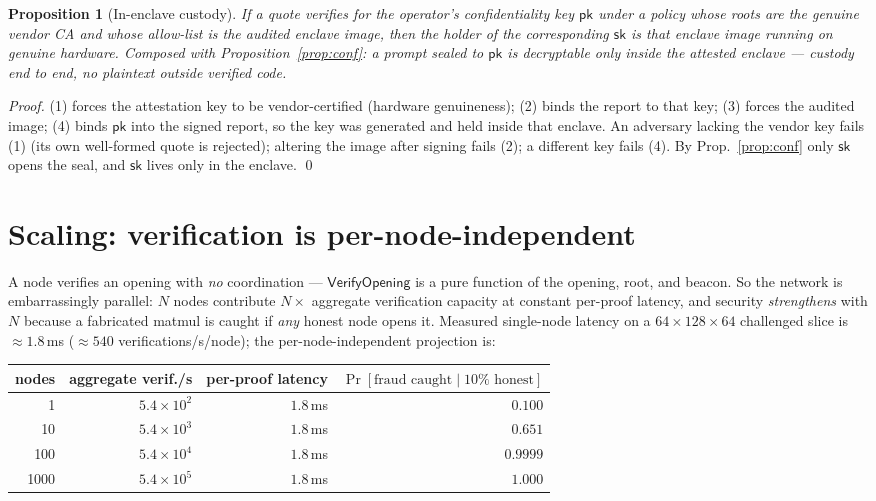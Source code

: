 \documentclass[11pt]{article}
\newtheorem{proposition}[theorem]{Proposition}
\begin{document}
\begin{proposition}[In-enclave custody]\label{prop:custody}
If a quote verifies for the operator's confidentiality key $\mathsf{pk}$ under a policy whose roots are
the genuine vendor CA and whose allow-list is the audited enclave image, then the holder of the
corresponding $\mathsf{sk}$ is that enclave image running on genuine hardware. Composed with
Proposition~\ref{prop:conf}: a prompt sealed to $\mathsf{pk}$ is decryptable \emph{only} inside the
attested enclave --- custody end to end, no plaintext outside verified code.
\end{proposition}
\begin{proof}
(1) forces the attestation key to be vendor-certified (hardware genuineness); (2) binds the report to
that key; (3) forces the audited image; (4) binds $\mathsf{pk}$ into the signed report, so the key was
generated and held inside that enclave. An adversary lacking the vendor key fails (1) (its own
well-formed quote is rejected); altering the image after signing fails (2); a different key fails (4).
By Prop.~\ref{prop:conf} only $\mathsf{sk}$ opens the seal, and $\mathsf{sk}$ lives only in the enclave.
\qed
\end{proof}

\section{Scaling: verification is per-node-independent}\label{sec:scale}

A node verifies an opening with \emph{no} coordination --- $\mathsf{VerifyOpening}$ is a pure function
of the opening, root, and beacon. So the network is embarrassingly parallel: $N$ nodes contribute $N\times$
aggregate verification capacity at constant per-proof latency, and security \emph{strengthens} with $N$
because a fabricated matmul is caught if \emph{any} honest node opens it. Measured single-node latency
on a $64\times128\times64$ challenged slice is $\approx 1.8$\,ms ($\approx 540$ verifications/s/node);
the per-node-independent projection is:

\begin{center}
\begin{tabular}{@{}rrrr@{}}
\toprule
nodes & aggregate verif./s & per-proof latency & $\Pr[\text{fraud caught} \mid 10\%\text{ honest}]$ \\
\midrule
1 & $5.4\times10^{2}$ & $1.8$\,ms & $0.100$ \\
10 & $5.4\times10^{3}$ & $1.8$\,ms & $0.651$ \\
100 & $5.4\times10^{4}$ & $1.8$\,ms & $0.9999$ \\
1000 & $5.4\times10^{5}$ & $1.8$\,ms & $1.000$ \\
\bottomrule
\end{tabular}
\end{center}
\end{document}
